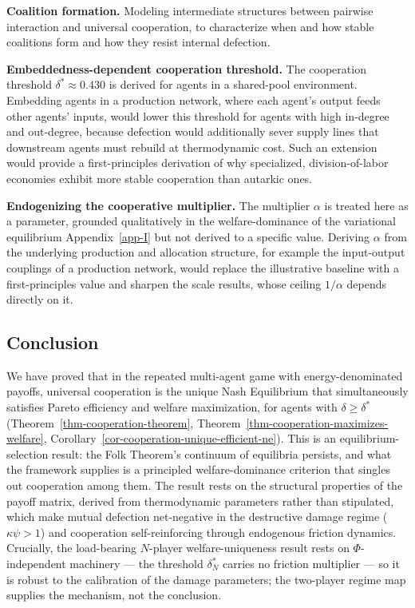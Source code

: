 \documentclass[11pt]{article}
\theoremstyle{plain}
\theoremstyle{definition}
\theoremstyle{remark}
\let\origsubsection\subsection
\renewcommand{\subsection}{\needspace{7\baselineskip}\origsubsection}
\begin{document}
\textbf{Coalition formation.} Modeling intermediate structures between
pairwise interaction and universal cooperation, to characterize when and
how stable coalitions form and how they resist internal defection.

\textbf{Embeddedness-dependent cooperation threshold.} The cooperation
threshold \(\delta^* \approx 0.430\) is derived for agents in a
shared-pool environment. Embedding agents in a production network, where
each agent's output feeds other agents' inputs, would lower this
threshold for agents with high in-degree and out-degree, because
defection would additionally sever supply lines that downstream agents
must rebuild at thermodynamic cost. Such an extension would provide a
first-principles derivation of why specialized, division-of-labor
economies exhibit more stable cooperation than autarkic ones.

\textbf{Endogenizing the cooperative multiplier.} The multiplier
\(\alpha\) is treated here as a parameter, grounded qualitatively in the
welfare-dominance of the variational equilibrium Appendix~\ref{app-I}
but not derived to a specific value. Deriving \(\alpha\) from the
underlying production and allocation structure, for example the
input-output couplings of a production network, would replace the
illustrative baseline with a first-principles value and sharpen the
scale results, whose ceiling \(1/\alpha\) depends directly on it.

\subsection{Conclusion}\label{conclusion-4}

We have proved that in the repeated multi-agent game with
energy-denominated payoffs, universal cooperation is the unique Nash
Equilibrium that simultaneously satisfies Pareto efficiency and welfare
maximization, for agents with \(\delta \geq \delta^*\)
(Theorem~\ref{thm-cooperation-theorem},
Theorem~\ref{thm-cooperation-maximizes-welfare},
Corollary~\ref{cor-cooperation-unique-efficient-ne}). This is an
equilibrium-selection result: the Folk Theorem's continuum of equilibria
persists, and what the framework supplies is a principled
welfare-dominance criterion that singles out cooperation among them. The
result rests on the structural properties of the payoff matrix, derived
from thermodynamic parameters rather than stipulated, which make mutual
defection net-negative in the destructive damage regime
(\(\kappa\psi > 1\)) and cooperation self-reinforcing through endogenous
friction dynamics. Crucially, the load-bearing \(N\)-player
welfare-uniqueness result rests on \(\Phi\)-independent machinery ---
the threshold \(\delta_N^*\) carries no friction multiplier --- so it is
robust to the calibration of the damage parameters; the two-player
regime map supplies the mechanism, not the conclusion.
\end{document}
